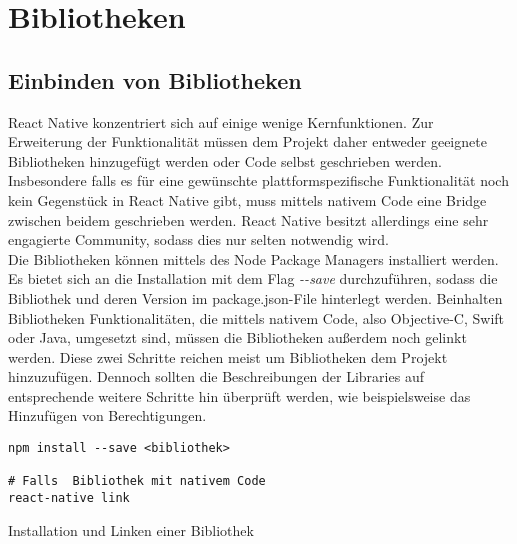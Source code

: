 \section{Bibliotheken}

\subsection{Einbinden von Bibliotheken}
React Native konzentriert sich auf einige wenige Kernfunktionen. Zur Erweiterung der Funktionalität müssen dem Projekt daher entweder geeignete Bibliotheken hinzugefügt werden oder Code selbst geschrieben werden. Insbesondere falls es für eine gewünschte plattformspezifische Funktionalität noch kein Gegenstück in React Native gibt, muss mittels nativem Code eine Bridge zwischen beidem geschrieben werden. React Native besitzt allerdings eine sehr engagierte Community, sodass dies nur selten notwendig wird.\\
Die Bibliotheken können mittels des Node Package Managers installiert werden. Es bietet sich an die Installation mit dem Flag \textit{-{}-save} durchzuführen, sodass die Bibliothek und deren Version im package.json-File hinterlegt werden. Beinhalten Bibliotheken Funktionalitäten, die mittels nativem Code, also Objective-C, Swift oder Java, umgesetzt sind, müssen die Bibliotheken außerdem noch gelinkt werden. Diese zwei Schritte reichen meist um Bibliotheken dem Projekt hinzuzufügen. Dennoch sollten die Beschreibungen der Libraries auf entsprechende weitere Schritte hin überprüft werden, wie beispielsweise das Hinzufügen von Berechtigungen. 

\begin{listing}[H]
    \begin{verbatim}
npm install --save <bibliothek>

# Falls  Bibliothek mit nativem Code
react-native link
    \end{verbatim}
    \caption{Installation und Linken einer Bibliothek}
    \label{lst:lib_install}
\end{listing}

